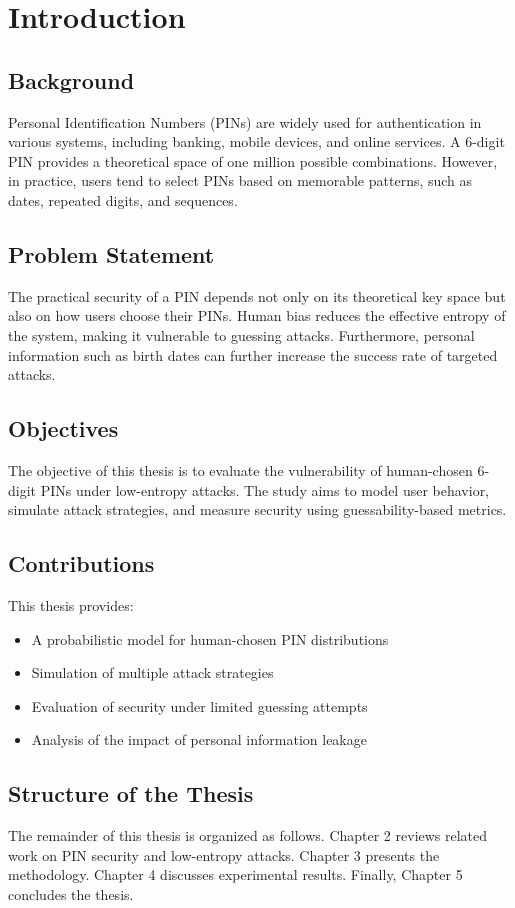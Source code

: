 \chapter{Introduction}

\section{Background}

Personal Identification Numbers (PINs) are widely used for authentication in various systems, 
including banking, mobile devices, and online services. A 6-digit PIN provides a theoretical 
space of one million possible combinations. However, in practice, users tend to select PINs 
based on memorable patterns, such as dates, repeated digits, and sequences.

\section{Problem Statement}

The practical security of a PIN depends not only on its theoretical key space but also on how 
users choose their PINs. Human bias reduces the effective entropy of the system, making it 
vulnerable to guessing attacks. Furthermore, personal information such as birth dates can 
further increase the success rate of targeted attacks.

\section{Objectives}

The objective of this thesis is to evaluate the vulnerability of human-chosen 6-digit PINs 
under low-entropy attacks. The study aims to model user behavior, simulate attack strategies, 
and measure security using guessability-based metrics.

\section{Contributions}

This thesis provides:
\begin{itemize}
    \item A probabilistic model for human-chosen PIN distributions
    \item Simulation of multiple attack strategies
    \item Evaluation of security under limited guessing attempts
    \item Analysis of the impact of personal information leakage
\end{itemize}

\section{Structure of the Thesis}

The remainder of this thesis is organized as follows. Chapter 2 reviews related work on PIN 
security and low-entropy attacks. Chapter 3 presents the methodology. Chapter 4 discusses 
experimental results. Finally, Chapter 5 concludes the thesis.